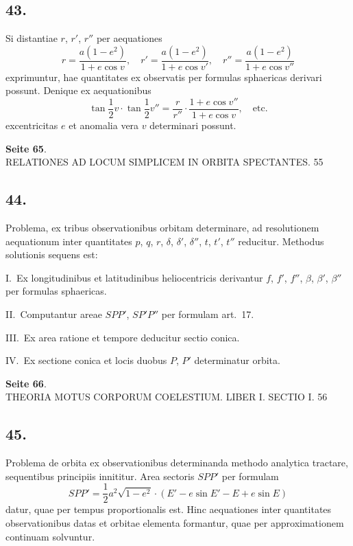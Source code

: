 \documentclass[12pt,a4paper]{article}
\begin{document}
\subsection*{43.}

Si distantiae $r$, $r'$, $r''$ per aequationes
\[
r = \frac{a(1-e^2)}{1+e \cos v}, \quad r' = \frac{a(1-e^2)}{1+e \cos v'}, \quad r'' = \frac{a(1-e^2)}{1+e \cos v''}
\]
exprimuntur, hae quantitates ex observatis per formulas sphaericas derivari possunt. Denique ex aequationibus
\[
\tan \frac{1}{2}v \cdot \tan \frac{1}{2}v'' = \frac{r}{r''} \cdot \frac{1+e \cos v''}{1+e \cos v}, \quad \text{etc.}
\]
excentricitas $e$ et anomalia vera $v$ determinari possunt.

\textbf{Seite 65}.\\
RELATIONES AD LOCUM SIMPLICEM IN ORBITA SPECTANTES. 55

\subsection*{44.}

Problema, ex tribus observationibus orbitam determinare, ad resolutionem aequationum inter quantitates $p$, $q$, $r$, $\delta$, $\delta'$, $\delta''$, $t$, $t'$, $t''$ reducitur. Methodus solutionis sequens est:

I.~Ex longitudinibus et latitudinibus heliocentricis derivantur $f$, $f'$, $f''$, $\beta$, $\beta'$, $\beta''$ per formulas sphaericas.

II.~Computantur areae $SPP'$, $SP'P''$ per formulam art.~17.

III.~Ex area ratione et tempore deducitur sectio conica.

IV.~Ex sectione conica et locis duobus $P$, $P'$ determinatur orbita.

\textbf{Seite 66}.\\
THEORIA MOTUS CORPORUM COELESTIUM. LIBER I. SECTIO I. 56

\subsection*{45.}

Problema de orbita ex observationibus determinanda methodo analytica tractare, sequentibus principiis innititur. Area sectoris $SPP'$ per formulam
\[
SPP' = \frac{1}{2} a^2 \sqrt{1-e^2} \cdot (E' - e \sin E' - E + e \sin E)
\]
datur, quae per tempus proportionalis est. Hinc aequationes inter quantitates observationibus datas et orbitae elementa formantur, quae per approximationem continuam solvuntur.
\end{document}

